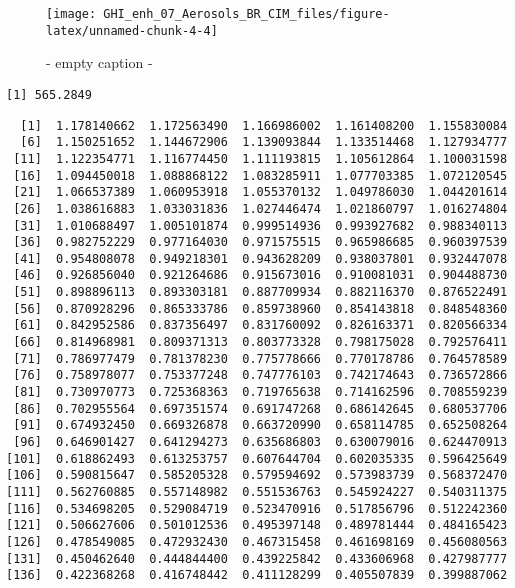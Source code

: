 \documentclass[
  10pt,
  a4paper,oneside]{article}
\begin{document}
\begin{figure}[H]

{\centering \texttt{[image: GHI\_enh\_07\_Aerosols\_BR\_CIM\_files/figure-latex/unnamed-chunk-4-4]} 

}

\caption{ - empty caption - }\label{fig:unnamed-chunk-4-4}
\end{figure}

\begin{verbatim}
[1] 565.2849
\end{verbatim}

\begin{verbatim}
  [1]  1.178140662  1.172563490  1.166986002  1.161408200  1.155830084
  [6]  1.150251652  1.144672906  1.139093844  1.133514468  1.127934777
 [11]  1.122354771  1.116774450  1.111193815  1.105612864  1.100031598
 [16]  1.094450018  1.088868122  1.083285911  1.077703385  1.072120545
 [21]  1.066537389  1.060953918  1.055370132  1.049786030  1.044201614
 [26]  1.038616883  1.033031836  1.027446474  1.021860797  1.016274804
 [31]  1.010688497  1.005101874  0.999514936  0.993927682  0.988340113
 [36]  0.982752229  0.977164030  0.971575515  0.965986685  0.960397539
 [41]  0.954808078  0.949218301  0.943628209  0.938037801  0.932447078
 [46]  0.926856040  0.921264686  0.915673016  0.910081031  0.904488730
 [51]  0.898896113  0.893303181  0.887709934  0.882116370  0.876522491
 [56]  0.870928296  0.865333786  0.859738960  0.854143818  0.848548360
 [61]  0.842952586  0.837356497  0.831760092  0.826163371  0.820566334
 [66]  0.814968981  0.809371313  0.803773328  0.798175028  0.792576411
 [71]  0.786977479  0.781378230  0.775778666  0.770178786  0.764578589
 [76]  0.758978077  0.753377248  0.747776103  0.742174643  0.736572866
 [81]  0.730970773  0.725368363  0.719765638  0.714162596  0.708559239
 [86]  0.702955564  0.697351574  0.691747268  0.686142645  0.680537706
 [91]  0.674932450  0.669326878  0.663720990  0.658114785  0.652508264
 [96]  0.646901427  0.641294273  0.635686803  0.630079016  0.624470913
[101]  0.618862493  0.613253757  0.607644704  0.602035335  0.596425649
[106]  0.590815647  0.585205328  0.579594692  0.573983739  0.568372470
[111]  0.562760885  0.557148982  0.551536763  0.545924227  0.540311375
[116]  0.534698205  0.529084719  0.523470916  0.517856796  0.512242360
[121]  0.506627606  0.501012536  0.495397148  0.489781444  0.484165423
[126]  0.478549085  0.472932430  0.467315458  0.461698169  0.456080563
[131]  0.450462640  0.444844400  0.439225842  0.433606968  0.427987777
[136]  0.422368268  0.416748442  0.411128299  0.405507839  0.399887062

\end{verbatim}
\end{document}
